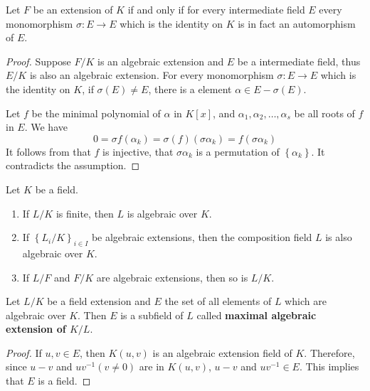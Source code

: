 \begin{theorem}
    Let $F$ be an extension of $K$ if and only if for every intermediate field $E$ every monomorphism $\sigma: E \rightarrow E$ which is the identity on $K$ is in fact an automorphism of $E$.
    \begin{proof}
        Suppose $F/K$ is an algebraic extension and $E$ be a intermediate field, thus $E/K$ is also an algebraic extension. For every monomorphism $\sigma: E \rightarrow E$ which is the identity on $K$, if $\sigma(E) \neq E$, there is a element $\alpha \in E- \sigma(E)$.

        Let $f$ be the minimal polynomial of $\alpha$ in $K[x]$, and $\alpha_1,\alpha_2,\ldots,\alpha_s$ be all roots of $f$ in $E$. We have
        \begin{equation*}
            0=
            \sigma f(\alpha_k)
            =
            \sigma (f)(\sigma\alpha_k)
            =
            f(\sigma\alpha_k)
        \end{equation*}
        It follows from that $f$ is injective, that $\sigma\alpha_k$ is a permutation of $\left\{\alpha_k\right\}$. It contradicts the assumption.
    \end{proof}
\end{theorem}



\begin{theorem}
    \label{thm:thm of algebraic extension}
    Let $K$ be a field.
    \begin{enumerate}
        \item
              If $L/K$ is finite, then $L$ is algebraic over $K$.
        \item
              If $\left\{L_i/K\right\}_{i \in I}$ be algebraic extensions, then the composition field $L$ is also algebraic over $K$.
        \item
              If $L/F$ and $F/K$ are algebraic extensions, then so is $L/K$.
    \end{enumerate}
\end{theorem}







\begin{theorem}
    Let $L/K$ be a field extension and $E$ the set of all elements of $L$ which are algebraic over $K$. Then $E$ is a subfield of $L$ called \textbf{maximal algebraic extension of $K/L$}.
    \begin{proof}
        If $u, v \in E$, then $K(u, v)$ is an algebraic extension field of $K$.
        Therefore, since $u-v$ and $u v^{-1}(v \neq 0)$ are in $K(u, v)$, $u-v$ and $u v^{-1} \in E$. This implies that $E$ is a field.
    \end{proof}
\end{theorem}


